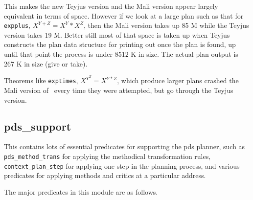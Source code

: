 This makes the new Teyjus version and the Mali version appear largely
equivalent in terms of space.  However if we look at a large plan such
as that for {\tt expplus}, $X^{Y + Z} = X^Y * X^Z$,
then the Mali version takes up 85 M while the Teyjus version takes 19
M.  Better still most of that space is taken up when Teyjus constructs
the plan data structure for printing out once the plan is found, up
until that point the process is under 8512 K in size.  The actual plan
output is 267 K in size (give or take).

Theorems like {\tt exptimes}, $X^{Y^Z} = X^{Y * Z}$,
which produce larger plans crashed the Mali version of \lclam\ every
time they were attempted, but go through the Teyjus version.


\subsection{pds\_support} 

This contains lots of essential predicates for supporting the pds
planner, such as {\tt
  pds\_method\_trans} for applying the
methodical transformation rules, {\tt context\_plan\_step} for
applying one step in the planning process, and various predicates for
applying methods and critics  at a particular
address.

The major predicates in this module are as follows.

